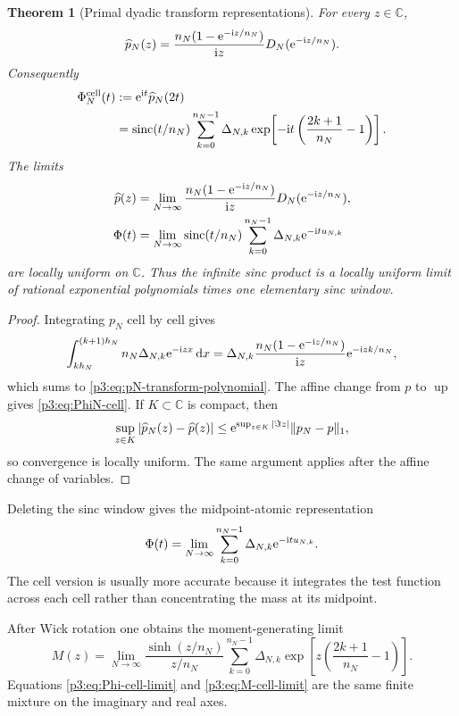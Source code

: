 \documentclass[11pt]{article}
\newtheorem{theorem}{Theorem}[section]
\theoremstyle{definition}
\theoremstyle{remark}
\newcommand{\C}{\mathbb C}
\newcommand{\dd}{\,\mathrm d}
\newcommand{\Up}{\operatorname{up}}
\begin{document}
\begin{theorem}[Primal dyadic transform representations]
\label{p3:thm:primal-transform}
For every $z\in\C$,
\begin{equation}\label{p3:eq:pN-transform-polynomial}
 \widehat p_N(z)
 =\frac{n_N(1-\mathrm e^{-\mathrm i z/n_N})}{\mathrm i z}
   D_N(\mathrm e^{-\mathrm i z/n_N}).
\end{equation}
Consequently
\begin{align}
 \Phi_N^{\mathrm{cell}}(t)
 &:=\mathrm e^{\mathrm i t}\widehat p_N(2t)\label{p3:eq:PhiN-cell-def}\\
 &=\operatorname{sinc}(t/n_N)
   \sum_{k=0}^{n_N-1}\Delta_{N,k}
   \exp\!\left[-\mathrm i t\left(\frac{2k+1}{n_N}-1\right)\right].
 \label{p3:eq:PhiN-cell}
\end{align}
The limits
\begin{align}
 \widehat p(z)&=\lim_{N\to\infty}
 \frac{n_N(1-\mathrm e^{-\mathrm i z/n_N})}{\mathrm i z}
 D_N(\mathrm e^{-\mathrm i z/n_N}),\label{p3:eq:p-transform-mass-limit}\\
 \Phi(t)&=\lim_{N\to\infty}\operatorname{sinc}(t/n_N)
 \sum_{k=0}^{n_N-1}\Delta_{N,k}\mathrm e^{-\mathrm i t u_{N,k}}
 \label{p3:eq:Phi-cell-limit}
\end{align}
are locally uniform on $\C$.  Thus the infinite sinc product is a locally
uniform limit of rational exponential polynomials times one elementary sinc
window.
\end{theorem}

\begin{proof}
Integrating $p_N$ cell by cell gives
\[
 \int_{kh_N}^{(k+1)h_N}n_N\Delta_{N,k}\e^{-\ii zx}\dd x
 =\Delta_{N,k}\frac{n_N(1-\e^{-\ii z/n_N})}{\ii z}
  \e^{-\ii zk/n_N},
\]
which sums to \eqref{p3:eq:pN-transform-polynomial}.  The affine change from $p$
to $\Up$ gives \eqref{p3:eq:PhiN-cell}.  If $K\subset\C$ is compact, then
\[
 \sup_{z\in K}|\widehat p_N(z)-\widehat p(z)|
 \le \mathrm e^{\sup_{z\in K}|\Im z|}\|p_N-p\|_1,
\]
so convergence is locally uniform.  The same argument applies after the affine
change of variables.
\end{proof}

Deleting the sinc window gives the midpoint-atomic representation
\begin{equation}\label{p3:eq:Phi-atomic-limit}
 \Phi(t)=\lim_{N\to\infty}
 \sum_{k=0}^{n_N-1}\Delta_{N,k}\mathrm e^{-\mathrm i t u_{N,k}}.
\end{equation}
The cell version is usually more accurate because it integrates the test
function across each cell rather than concentrating the mass at its midpoint.

After Wick rotation one obtains the moment-generating limit
\begin{equation}\label{p3:eq:M-cell-limit}
 M(z)=\lim_{N\to\infty}
 \frac{\sinh(z/n_N)}{z/n_N}
 \sum_{k=0}^{n_N-1}\Delta_{N,k}
 \exp\!\left[z\left(\frac{2k+1}{n_N}-1\right)\right].
\end{equation}
Equations \eqref{p3:eq:Phi-cell-limit} and \eqref{p3:eq:M-cell-limit} are the same
finite mixture on the imaginary and real axes.
\end{document}
